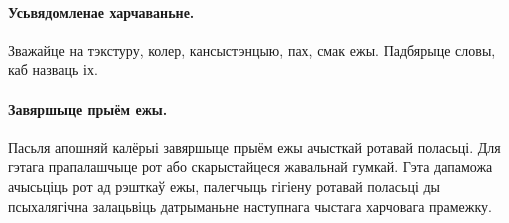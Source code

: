 \paragraph{Усьвядомленае харчаваньне.}
Зважайце на тэкстуру, колер, кансыстэнцыю, пах, смак ежы. Падбярыце словы, каб назваць іх.

\paragraph{Завяршыце прыём ежы.}
Пасьля апошняй калёрыі завяршыце прыём ежы ачысткай ротавай поласьці. Для гэтага прапалашчыце рот або скарыстайцеся жавальнай гумкай. Гэта дапаможа ачысьціць рот ад рэшткаў ежы, палегчыць гігіену ротавай поласьці ды псыхалягічна залацьвіць датрыманьне наступнага чыстага харчовага прамежку.